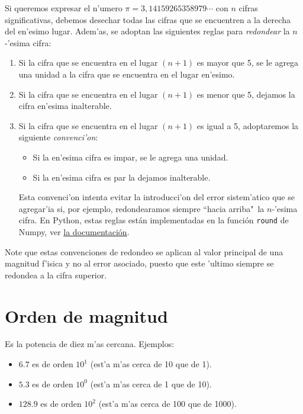 Si queremos expresar el n'umero $\pi=3,14159265358979\cdots$ con $n$
cifras significativas, debemos desechar todas las cifras que se
encuentren a la derecha del en'esimo lugar. Adem'as, se adoptan las siguientes reglas para \emph{redondear} la $n$-'esima cifra:
\begin{enumerate}
\item Si la cifra que se encuentra en el lugar $(n + 1)$ es mayor que 5, se
  le agrega una unidad a la cifra que se encuentra en el lugar en'esimo.
\item Si la cifra que se encuentra en el lugar $(n + 1)$ es menor que 5,
  dejamos la cifra en'esima inalterable.
\item Si la cifra que se encuentra en el lugar $(n + 1)$ es igual a 5,
  adoptaremos la siguiente \textit{convenci'on}:
	\begin{itemize}
	\item Si la en'esima cifra es impar, se le agrega una unidad.
	\item Si la en'esima cifra es par la dejamos inalterable.
	\end{itemize}
Esta convenci'on intenta evitar la introducci'on del error sistem'atico que se agregar'ia si, por ejemplo, redondearamos siempre ``hacia arriba"\, la $n$-'esima cifra. En Python, estas reglas están implementadas en la función \texttt{round} de Numpy, ver \href{https://docs.scipy.org/doc/numpy/reference/generated/numpy.round_.html}{la documentaci\'on}.
\end{enumerate}

Note que estas convenciones de redondeo se aplican al valor principal de una magnitud f'isica y no al error asociado, puesto que este 'ultimo siempre se redondea a la cifra superior.

\section{Orden de magnitud}
Es la potencia de diez m'as cercana. 
Ejemplos:
\begin{itemize}
\item $6.7$ es de orden $10^1$ (est'a m'as cerca de 10 que de 1).
\item $5.3$ es de orden $10^0$ (est'a m'as cerca de 1 que de 10).
\item $128.9$ es de orden $10^2$ (est'a m'as cerca de 100 que de 1000).
\end{itemize}






